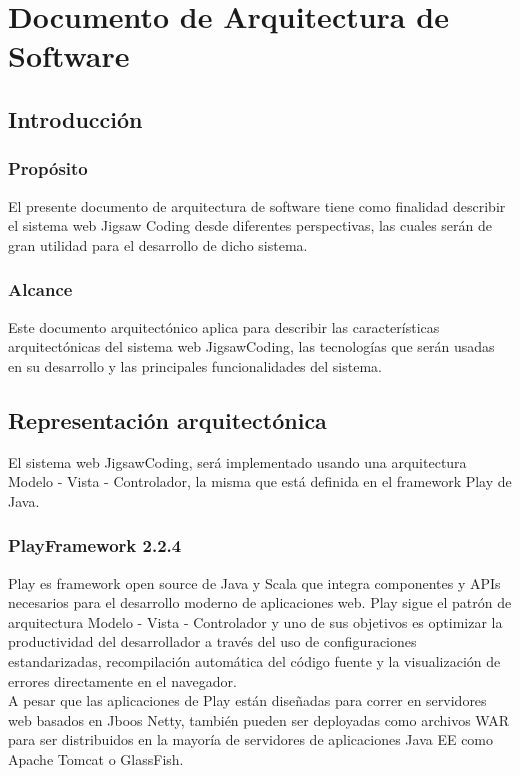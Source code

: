 \chapter{Documento de Arquitectura de Software}
\section{Introducción}
\subsection{Propósito}
El presente documento de arquitectura de software tiene como finalidad describir el sistema web Jigsaw Coding desde diferentes perspectivas, las cuales serán de gran utilidad para el desarrollo de dicho sistema. 
\subsection{Alcance} Este documento arquitectónico aplica para describir las características arquitectónicas del sistema web JigsawCoding, las tecnologías que serán usadas en su desarrollo y las principales funcionalidades del sistema.
\clearpage
\section{Representación arquitectónica}
El sistema web JigsawCoding, será implementado usando una arquitectura Modelo - Vista - Controlador, la misma que está definida en el framework Play de Java.
\subsection{PlayFramework 2.2.4}
Play es framework open source de Java y Scala que integra componentes y APIs necesarios para el desarrollo moderno de aplicaciones web. Play sigue el patrón de arquitectura Modelo - Vista - Controlador y uno de sus objetivos es optimizar la productividad del desarrollador a través del uso de configuraciones estandarizadas, recompilación automática del código fuente y la visualización de errores directamente en el navegador.\\

A pesar que las aplicaciones de Play están diseñadas para correr en servidores web basados en Jboos Netty, también pueden ser deployadas como archivos WAR para ser distribuidos en la mayoría de servidores de aplicaciones Java EE como Apache Tomcat o GlassFish.

